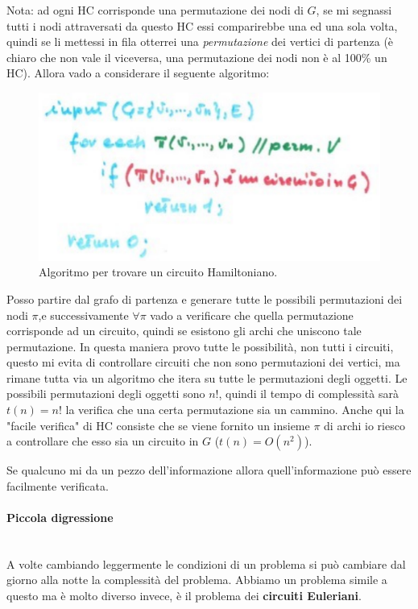\documentclass{article}
\begin{document}
Nota: ad ogni HC corrisponde una permutazione dei nodi di $G$, se mi segnassi tutti i nodi
attraversati da questo HC essi comparirebbe una ed una sola volta, quindi se li mettessi
in fila otterrei una \textit{permutazione} dei vertici di partenza (è chiaro
che non vale il viceversa, una permutazione dei nodi non è al 100\% un HC). Allora
vado a considerare il seguente algoritmo:
\begin{figure}[H]
    \centering
    \includegraphics[scale=0.6]{images/algo_HC.png}
    \caption{Algoritmo per trovare un circuito Hamiltoniano.}
\end{figure}
Posso partire dal grafo di partenza e generare tutte le possibili permutazioni dei nodi
$\pi$,e successivamente $\forall\pi$ vado a verificare che quella permutazione corrisponde ad un circuito,
quindi se esistono gli archi che uniscono tale permutazione.
In questa maniera provo tutte le possibilità, non tutti i circuiti, questo mi evita di controllare
circuiti che non sono permutazioni dei vertici, ma rimane tutta via un algoritmo che itera
su tutte le permutazioni degli oggetti. Le possibili permutazioni degli oggetti sono $n!$,
quindi il tempo di complessità sarà $t(n)=n!$ la verifica che una certa permutazione sia un
cammino. Anche qui la "facile verifica" di HC consiste che se viene fornito un insieme $\pi$
di archi io riesco a controllare che esso sia un circuito in $G$ ($t(n)=O(n^2)$).

Se qualcuno mi da un pezzo dell'informazione allora quell'informazione può essere facilmente
verificata.

\paragraph{Piccola digressione}\mbox{}\\
A volte cambiando leggermente le condizioni di un problema si può cambiare dal giorno
alla notte la complessità del problema. Abbiamo un problema simile a questo ma è
molto diverso invece, è il problema dei \textbf{circuiti Euleriani}.
\end{document}
